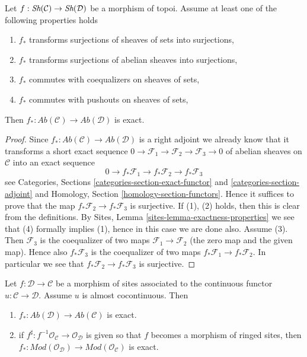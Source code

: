 \begin{lemma}
\label{lemma-exactness}
Let $f : \mathop{\textit{Sh}}\nolimits(\mathcal{C}) \to \mathop{\textit{Sh}}\nolimits(\mathcal{D})$ be
a morphism of topoi. Assume at least one of the following properties
holds
\begin{enumerate}
\item $f_*$ transforms surjections of sheaves of sets into surjections,
\item $f_*$ transforms surjections of abelian sheaves into surjections,
\item $f_*$ commutes with coequalizers on sheaves of sets,
\item $f_*$ commutes with pushouts on sheaves of sets,
\end{enumerate}
Then $f_* : \textit{Ab}(\mathcal{C}) \to \textit{Ab}(\mathcal{D})$
is exact.
\end{lemma}

\begin{proof}
Since $f_* : \textit{Ab}(\mathcal{C}) \to \textit{Ab}(\mathcal{D})$
is a right adjoint we already know that it transforms a short exact sequence
$0 \to \mathcal{F}_1 \to \mathcal{F}_2 \to \mathcal{F}_3 \to 0$
of abelian sheaves on $\mathcal{C}$ into an exact sequence
$$
0 \to f_*\mathcal{F}_1 \to f_*\mathcal{F}_2 \to f_*\mathcal{F}_3
$$
see
Categories, Sections \ref{categories-section-exact-functor} and
\ref{categories-section-adjoint}
and
Homology, Section \ref{homology-section-functors}. Hence it suffices to
prove that the map $f_*\mathcal{F}_2 \to f_*\mathcal{F}_3$ is surjective.
If (1), (2) holds, then this is clear from the definitions. By
Sites, Lemma \ref{sites-lemma-exactness-properties}
we see that (4) formally implies (1), hence in this case we are done also.
Assume (3). Then $\mathcal{F}_3$ is the coequalizer of two maps
$\mathcal{F}_1 \to \mathcal{F}_2$ (the zero map and the given map).
Hence also $f_*\mathcal{F}_3$ is the coequalizer of two maps
$f_*\mathcal{F}_1 \to f_*\mathcal{F}_2$. In particular we see that
$f_*\mathcal{F}_2 \to f_*\mathcal{F}_3$ is surjective.
\end{proof}

\begin{lemma}
\label{lemma-morphism-ringed-sites-almost-cocontinuous}
Let $f : \mathcal{D} \to \mathcal{C}$ be a morphism of sites
associated to the continuous functor $u : \mathcal{C} \to \mathcal{D}$.
Assume $u$ is almost cocontinuous. Then
\begin{enumerate}
\item $f_* : \textit{Ab}(\mathcal{D}) \to \textit{Ab}(\mathcal{C})$ is exact.
\item if $f^\sharp : f^{-1}\mathcal{O}_\mathcal{C} \to \mathcal{O}_\mathcal{D}$
is given so that $f$ becomes a morphism of ringed sites, then
$f_* : \textit{Mod}(\mathcal{O}_\mathcal{D}) \to
\textit{Mod}(\mathcal{O}_\mathcal{C})$ is exact.
\end{enumerate}
\end{lemma}

